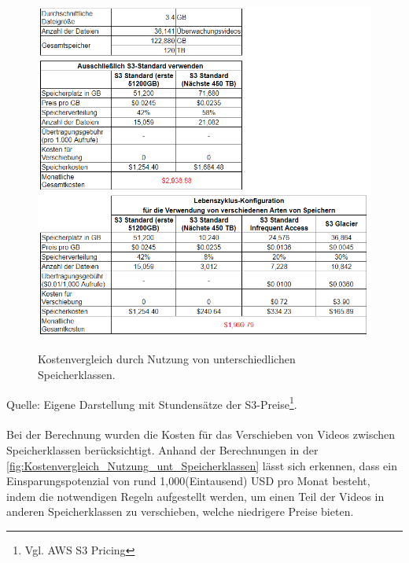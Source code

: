\begin{figure}[h!]
  \centering
  \includegraphics[scale=0.75]{sources/Kostenvergleich_Nutzung_unt_Speicherklassen}
  \caption[Kostenvergleich durch Nutzung von unterschiedlichen Speicherklassen]{}\label{fig:Kostenvergleich_Nutzung_unt_Speicherklassen} 
  Kostenvergleich durch Nutzung von unterschiedlichen Speicherklassen.  
\end{figure}
Quelle: Eigene Darstellung mit Stundensätze der S3-Preise\footnote{Vgl. AWS S3 Pricing\cite{AMZ09}}.
\\\\
Bei der Berechnung wurden die Kosten für das Verschieben von Videos zwischen Speicherklassen berücksichtigt. Anhand der Berechnungen in der \autoref{fig:Kostenvergleich_Nutzung_unt_Speicherklassen} lässt sich erkennen, dass ein Einsparungspotenzial von rund 1,000(Eintausend) USD pro Monat besteht, indem die notwendigen Regeln aufgestellt werden, um einen Teil der Videos in anderen Speicherklassen zu verschieben, welche niedrigere Preise bieten.
\newpage

